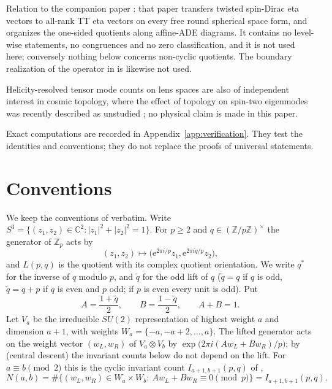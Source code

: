 \documentclass[11pt]{article}
\theoremstyle{definition}
\newcommand{\Z}{\mathbb Z}
\newcommand{\C}{\mathbb C}
\newcommand{\e}{\mathrm e}
\begin{document}
Relation to the companion paper \cite{MahmoodP3Collection2026}: that
paper transfers twisted spin-Dirac eta vectors to all-rank TT eta vectors
on every free round spherical space form, and organizes the one-sided
quotients along affine-ADE diagrams.  It contains no level-wise
statements, no congruences and no zero classification, and it is not used
here; conversely nothing below concerns non-cyclic quotients.  The
boundary realization of the operator in \cite{MahmoodP7Collection2026}
is likewise not used.

Helicity-resolved tensor mode counts on lens spaces are also of
independent interest in cosmic topology, where the effect of topology on
spin-two eigenmodes was recently described as unstudied
\cite{COMPACTIIIa2024}; no physical claim is made in this paper.

Exact computations are recorded in Appendix~\ref{app:verification}.
They test the identities and conventions; they do not replace the
proofs of universal statements.

\section{Conventions}
\label{sec:conventions}

We keep the conventions of \cite[Sec.~2]{MahmoodP1Collection2026}
verbatim.  Write
$S^3=\{(z_1,z_2)\in\C^2:|z_1|^2+|z_2|^2=1\}$.  For $p\geq2$ and
$q\in(\Z/p\Z)^\times$ the generator of $\Z_p$ acts by
\[
 (z_1,z_2)\longmapsto\bigl(\e^{2\pi i/p}z_1,\e^{2\pi iq/p}z_2\bigr),
\]
and $L(p,q)$ is the quotient with its complex quotient orientation.  We
write $q^*$ for the inverse of $q$ modulo $p$, and $\tilde q$ for the odd
lift of $q$ ($\tilde q=q$ if $q$ is odd, $\tilde q=q+p$ if $q$ is even
and $p$ odd; if $p$ is even every unit is odd).  Put
\begin{equation}
 A=\frac{1+\tilde q}{2},\qquad B=\frac{1-\tilde q}{2},\qquad A+B=1.
 \label{eq:AB}
\end{equation}
Let $V_a$ be the irreducible $SU(2)$ representation of highest weight $a$
and dimension $a+1$, with weights $W_a=\{-a,-a+2,\ldots,a\}$.  The lifted
generator acts on the weight vector $(w_L,w_R)$ of $V_a\otimes V_b$ by
$\exp\bigl(2\pi i(Aw_L+Bw_R)/p\bigr)$; by
\cite[Lem.~5.2]{MahmoodP1Collection2026} (central descent) the invariant
counts below do not depend on the lift.  For $a\equiv b\pmod2$ this is the
cyclic invariant count $I_{a+1,b+1}(p,q)$ of
\cite[Sec.~2]{MahmoodP1Collection2026},
\begin{equation}
 N(a,b)=\#\{(w_L,w_R)\in W_a\times W_b:\ Aw_L+Bw_R\equiv0\pmod p\}
 =I_{a+1,b+1}(p,q).
 \label{eq:Nab}
\end{equation}
\end{document}
